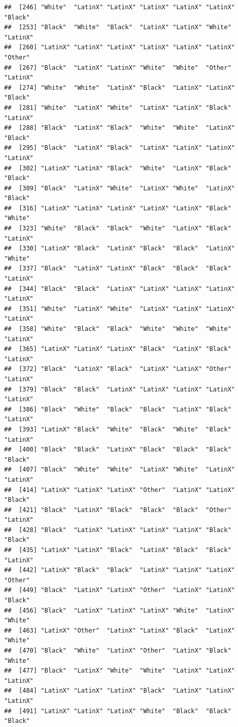 \documentclass[]{book}
\begin{document}
\begin{verbatim}
##  [246] "White"  "LatinX" "LatinX" "LatinX" "LatinX" "LatinX" "Black" 
##  [253] "Black"  "White"  "Black"  "LatinX" "LatinX" "White"  "LatinX"
##  [260] "LatinX" "LatinX" "LatinX" "LatinX" "LatinX" "LatinX" "Other" 
##  [267] "Black"  "LatinX" "LatinX" "White"  "White"  "Other"  "LatinX"
##  [274] "White"  "White"  "LatinX" "Black"  "LatinX" "LatinX" "Black" 
##  [281] "White"  "LatinX" "White"  "LatinX" "LatinX" "Black"  "LatinX"
##  [288] "Black"  "LatinX" "Black"  "White"  "White"  "LatinX" "Black" 
##  [295] "Black"  "LatinX" "Black"  "LatinX" "LatinX" "LatinX" "LatinX"
##  [302] "LatinX" "LatinX" "Black"  "White"  "LatinX" "Black"  "Black" 
##  [309] "Black"  "LatinX" "White"  "LatinX" "White"  "LatinX" "Black" 
##  [316] "LatinX" "LatinX" "LatinX" "LatinX" "LatinX" "Black"  "White" 
##  [323] "White"  "Black"  "Black"  "White"  "LatinX" "Black"  "LatinX"
##  [330] "LatinX" "Black"  "LatinX" "Black"  "Black"  "LatinX" "White" 
##  [337] "Black"  "LatinX" "LatinX" "Black"  "Black"  "Black"  "LatinX"
##  [344] "Black"  "Black"  "LatinX" "LatinX" "LatinX" "LatinX" "LatinX"
##  [351] "White"  "LatinX" "White"  "LatinX" "LatinX" "LatinX" "LatinX"
##  [358] "White"  "Black"  "Black"  "White"  "White"  "White"  "LatinX"
##  [365] "LatinX" "LatinX" "LatinX" "Black"  "LatinX" "Black"  "LatinX"
##  [372] "Black"  "LatinX" "Black"  "LatinX" "LatinX" "Other"  "LatinX"
##  [379] "Black"  "Black"  "LatinX" "LatinX" "LatinX" "LatinX" "LatinX"
##  [386] "Black"  "White"  "Black"  "Black"  "LatinX" "Black"  "LatinX"
##  [393] "LatinX" "Black"  "White"  "Black"  "White"  "Black"  "LatinX"
##  [400] "Black"  "Black"  "LatinX" "Black"  "Black"  "Black"  "Black" 
##  [407] "Black"  "White"  "White"  "LatinX" "White"  "LatinX" "LatinX"
##  [414] "LatinX" "LatinX" "LatinX" "Other"  "LatinX" "LatinX" "Black" 
##  [421] "Black"  "LatinX" "Black"  "Black"  "Black"  "Other"  "LatinX"
##  [428] "Black"  "LatinX" "LatinX" "LatinX" "LatinX" "Black"  "Black" 
##  [435] "LatinX" "LatinX" "Black"  "LatinX" "Black"  "Black"  "LatinX"
##  [442] "LatinX" "Black"  "Black"  "LatinX" "LatinX" "LatinX" "Other" 
##  [449] "Black"  "LatinX" "LatinX" "Other"  "LatinX" "LatinX" "Black" 
##  [456] "Black"  "LatinX" "LatinX" "LatinX" "White"  "LatinX" "White" 
##  [463] "LatinX" "Other"  "LatinX" "LatinX" "Black"  "LatinX" "White" 
##  [470] "Black"  "White"  "LatinX" "Other"  "LatinX" "Black"  "White" 
##  [477] "Black"  "LatinX" "White"  "White"  "LatinX" "LatinX" "LatinX"
##  [484] "LatinX" "LatinX" "LatinX" "Black"  "LatinX" "LatinX" "LatinX"
##  [491] "LatinX" "LatinX" "LatinX" "White"  "Black"  "Black"  "Black" 

\end{verbatim}
\end{document}
